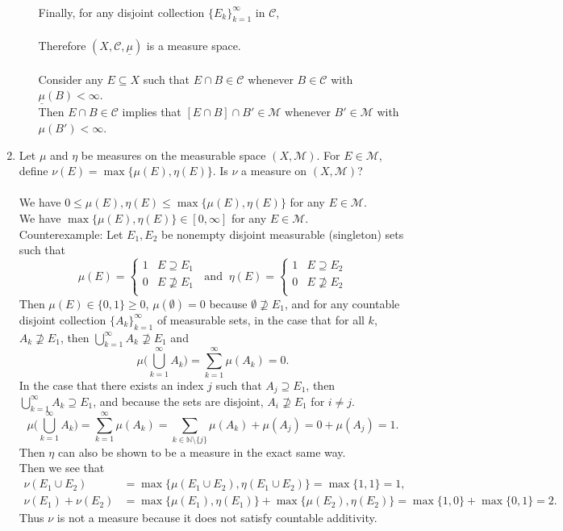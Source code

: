 \begin{enumerate}
\begin{enumerate}[label=(\roman*),align=left]
		\\Finally, for any disjoint collection $\{E_k\}_{k=1}^\infty$ in $\mathcal{C}$,\\
		\\Therefore $(X,\mathcal{C},\underline\mu)$ is a measure space.\\
		\\Consider any $E\subseteq X$ such that $E\cap B\in\mathcal{C}$ whenever $B\in\mathcal{C}$ with $\underline\mu(B)<\infty$.
		\\Then $E\cap B\in\mathcal{C}$ implies that $[E\cap B]\cap B'\in\mathcal{M}$ whenever $B'\in\mathcal{M}$ with $\mu(B')<\infty$.
	\end{enumerate}
	\item Let $\mu$ and $\eta$ be measures on the measurable space $(X,\mathcal{M})$.
	For $E\in\mathcal{M}$, define $\nu(E)=\max\{\mu(E),\eta(E)\}$. Is $\nu$ a measure on $(X,\mathcal{M})$?\\
	\\We have $0\le\mu(E),\eta(E)\le\max\{\mu(E),\eta(E)\}$ for any $E\in\mathcal{M}$.
	\\We have $\max\{\mu(E),\eta(E)\}\in[0,\infty]$ for any $E\in\mathcal{M}$.
	\\Counterexample:
	Let $E_1,E_2$ be nonempty disjoint measurable (singleton) sets such that
	\[
		\mu(E)=
		\begin{cases}
			1&E\supseteq E_1\\
			0&E\not\supseteq E_1\\
		\end{cases}
		\ \text{ and }\ \eta(E)=
		\begin{cases}
			1&E\supseteq E_2\\
			0&E\not\supseteq E_2\\
		\end{cases}
	\]
	Then $\mu(E)\in\{0,1\}\ge0$, $\mu(\emptyset)=0$ because $\emptyset\not\supseteq E_1$, and for any countable disjoint collection $\{A_k\}_{k=1}^\infty$ of measurable sets,
	in the case that for all $k$, $A_k\not\supseteq E_1$, then $\bigcup_{k=1}^\infty A_k\not\supseteq E_1$ and 
	\[
		\mu\biggl(\bigcup_{k=1}^\infty A_k\biggr)=\sum_{k=1}^\infty\mu(A_k)=0.
	\]
	In the case that there exists an index $j$ such that $A_j\supseteq E_1$, then $\bigcup_{k=1}^\infty A_k\supseteq E_1$, and because the sets are disjoint, $A_i\not\supseteq E_1$ for $i\neq j$.
	\[
		\mu\biggl(\bigcup_{k=1}^\infty A_k\biggr)=\sum_{k=1}^\infty\mu(A_k)=\sum_{k\in\mathbb{N}\setminus\{j\}}\mu(A_k)+\mu(A_j)=0+\mu(A_j)=1.
	\]
	Then $\eta$ can also be shown to be a measure in the exact same way.
	\\Then we see that
	\begin{align*}
		\nu(E_1\cup E_2)&=\max\{\mu(E_1\cup E_2),\eta(E_1\cup E_2)\}=\max\{1,1\}=1,\\
		\nu(E_1)+\nu(E_2)&=\max\{\mu(E_1),\eta(E_1)\}+\max\{\mu(E_2),\eta(E_2)\}=\max\{1,0\}+\max\{0,1\}=2.
	\end{align*}
	Thus $\nu$ is not a measure because it does not satisfy countable additivity.
\end{enumerate}

